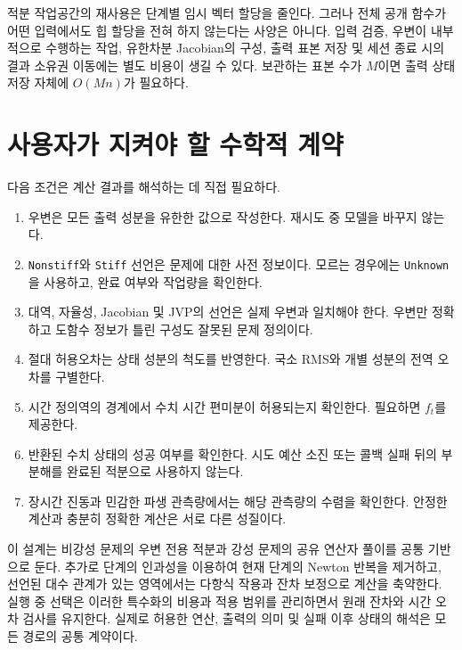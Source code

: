 \documentclass[
  10pt,
  dvipsnames]{article}
\providecommand{\tightlist}{%
  \setlength{\itemsep}{0pt}\setlength{\parskip}{0pt}}
\begin{document}
적분 작업공간의 재사용은 단계별 임시 벡터 할당을 줄인다. 그러나 전체
공개 함수가 어떤 입력에서도 힙 할당을 전혀 하지 않는다는 사양은 아니다.
입력 검증, 우변이 내부적으로 수행하는 작업, 유한차분 Jacobian의 구성,
출력 표본 저장 및 세션 종료 시의 결과 소유권 이동에는 별도 비용이 생길
수 있다. 보관하는 표본 수가 \(M\)이면 출력 상태 저장 자체에 \(O(Mn)\)가
필요하다.

\hypertarget{uxc0acuxc6a9uxc790uxac00-uxc9c0uxcf1cuxc57c-uxd560-uxc218uxd559uxc801-uxacc4uxc57d}{%
\section{사용자가 지켜야 할 수학적
계약}\label{uxc0acuxc6a9uxc790uxac00-uxc9c0uxcf1cuxc57c-uxd560-uxc218uxd559uxc801-uxacc4uxc57d}}

다음 조건은 계산 결과를 해석하는 데 직접 필요하다.

\begin{enumerate}
\def\labelenumi{\arabic{enumi}.}
\tightlist
\item
  우변은 모든 출력 성분을 유한한 값으로 작성한다. 재시도 중 모델을
  바꾸지 않는다.
\item
  \texttt{Nonstiff}와 \texttt{Stiff} 선언은 문제에 대한 사전 정보이다.
  모르는 경우에는 \texttt{Unknown}을 사용하고, 완료 여부와 작업량을
  확인한다.
\item
  대역, 자율성, Jacobian 및 JVP의 선언은 실제 우변과 일치해야 한다.
  우변만 정확하고 도함수 정보가 틀린 구성도 잘못된 문제 정의이다.
\item
  절대 허용오차는 상태 성분의 척도를 반영한다. 국소 RMS와 개별 성분의
  전역 오차를 구별한다.
\item
  시간 정의역의 경계에서 수치 시간 편미분이 허용되는지 확인한다.
  필요하면 \(f_t\)를 제공한다.
\item
  반환된 수치 상태의 성공 여부를 확인한다. 시도 예산 소진 또는 콜백 실패
  뒤의 부분해를 완료된 적분으로 사용하지 않는다.
\item
  장시간 진동과 민감한 파생 관측량에서는 해당 관측량의 수렴을 확인한다.
  안정한 계산과 충분히 정확한 계산은 서로 다른 성질이다.
\end{enumerate}

이 설계는 비강성 문제의 우변 전용 적분과 강성 문제의 공유 연산자 풀이를
공통 기반으로 둔다. 추가로 단계의 인과성을 이용하여 현재 단계의 Newton
반복을 제거하고, 선언된 대수 관계가 있는 영역에서는 다항식 작용과 잔차
보정으로 계산을 축약한다. 실행 중 선택은 이러한 특수화의 비용과 적용
범위를 관리하면서 원래 잔차와 시간 오차 검사를 유지한다. 실제로 허용한
연산, 출력의 의미 및 실패 이후 상태의 해석은 모든 경로의 공통 계약이다.
\end{document}
